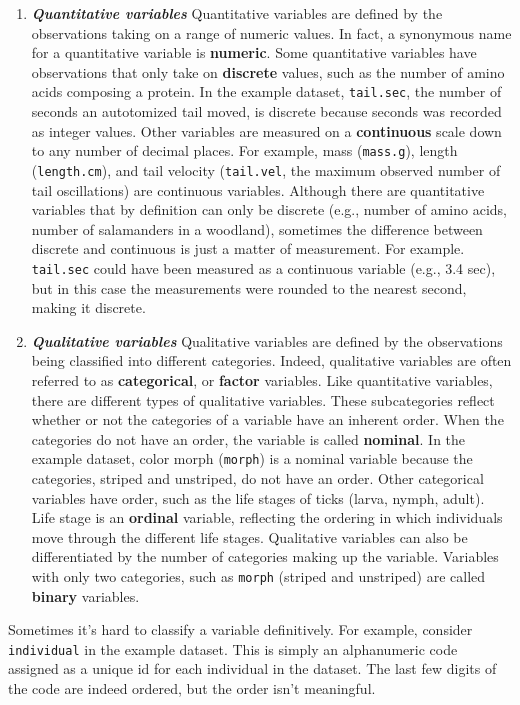 \documentclass[
]{book}
\begin{document}
\begin{enumerate}
\def\labelenumi{\arabic{enumi}.}
\item
  \textbf{\emph{Quantitative variables}} Quantitative variables are defined by the observations taking on a range of numeric values. In fact, a synonymous name for a quantitative variable is \textbf{numeric}. Some quantitative variables have observations that only take on \textbf{discrete} values, such as the number of amino acids composing a protein. In the example dataset, \texttt{tail.sec}, the number of seconds an autotomized tail moved, is discrete because seconds was recorded as integer values. Other variables are measured on a \textbf{continuous} scale down to any number of decimal places. For example, mass (\texttt{mass.g}), length (\texttt{length.cm}), and tail velocity (\texttt{tail.vel}, the maximum observed number of tail oscillations) are continuous variables. Although there are quantitative variables that by definition can only be discrete (e.g., number of amino acids, number of salamanders in a woodland), sometimes the difference between discrete and continuous is just a matter of measurement. For example. \texttt{tail.sec} could have been measured as a continuous variable (e.g., 3.4 sec), but in this case the measurements were rounded to the nearest second, making it discrete.
\item
  \textbf{\emph{Qualitative variables}} Qualitative variables are defined by the observations being classified into different categories. Indeed, qualitative variables are often referred to as \textbf{categorical}, or \textbf{factor} variables. Like quantitative variables, there are different types of qualitative variables. These subcategories reflect whether or not the categories of a variable have an inherent order. When the categories do not have an order, the variable is called \textbf{nominal}. In the example dataset, color morph (\texttt{morph}) is a nominal variable because the categories, striped and unstriped, do not have an order. Other categorical variables have order, such as the life stages of ticks (larva, nymph, adult). Life stage is an \textbf{ordinal} variable, reflecting the ordering in which individuals move through the different life stages. Qualitative variables can also be differentiated by the number of categories making up the variable. Variables with only two categories, such as \texttt{morph} (striped and unstriped) are called \textbf{binary} variables.
\end{enumerate}

Sometimes it's hard to classify a variable definitively. For example, consider \texttt{individual} in the example dataset. This is simply an alphanumeric code assigned as a unique id for each individual in the dataset. The last few digits of the code are indeed ordered, but the order isn't meaningful.
\end{document}
